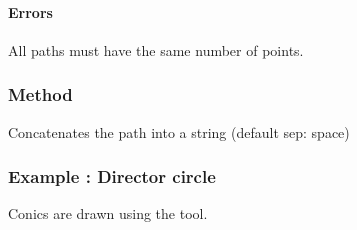 \paragraph{Errors} All paths must have the same number of points.





\subsubsection{Method }
\label{ssub:method_tkzmeth_path_concat}

Concatenates the path into a string (default sep: space)

\begin{tkzexample}[latex=.3\textwidth]
\end{tkzexample}


\subsubsection{Example : Director circle }
\label{ssub:director_circle}


Conics are drawn using the  tool.

